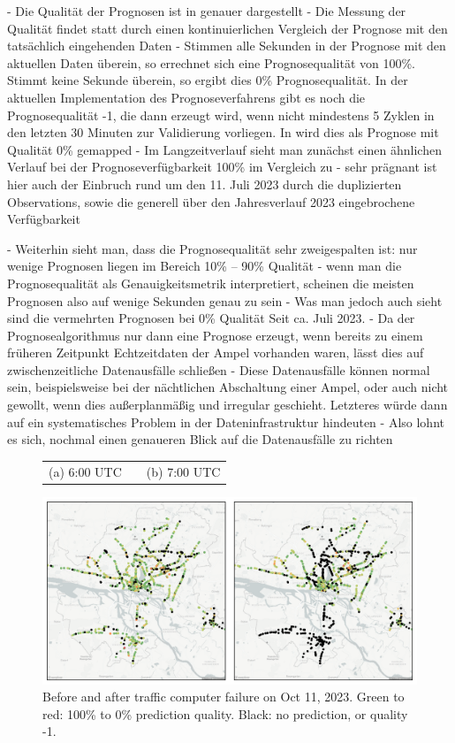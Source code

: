 - Die Qualität der Prognosen ist in  genauer dargestellt
- Die Messung der Qualität findet statt durch einen kontinuierlichen Vergleich der Prognose mit den tatsächlich eingehenden Daten
- Stimmen alle Sekunden in der Prognose mit den aktuellen Daten überein, so errechnet sich eine Prognosequalität von 100\%. Stimmt keine Sekunde überein, so ergibt dies 0\% Prognosequalität. In der aktuellen Implementation des Prognoseverfahrens gibt es noch die Prognosequalität -1, die dann erzeugt wird, wenn nicht mindestens 5 Zyklen in den letzten 30 Minuten zur Validierung vorliegen. In  wird dies als Prognose mit Qualität 0\% gemapped 
- Im Langzeitverlauf sieht man zunächst einen ähnlichen Verlauf bei der Prognoseverfügbarkeit 100\% im Vergleich zu  - sehr prägnant ist hier auch der Einbruch rund um den 11. Juli 2023 durch die duplizierten Observations, sowie die generell über den Jahresverlauf 2023 eingebrochene Verfügbarkeit

- Weiterhin sieht man, dass die Prognosequalität sehr zweigespalten ist: nur wenige Prognosen liegen im Bereich 10\% -- 90\% Qualität - wenn man die Prognosequalität als Genauigkeitsmetrik interpretiert, scheinen die meisten Prognosen also auf wenige Sekunden genau zu sein
- Was man jedoch auch sieht sind die vermehrten Prognosen bei 0\% Qualität Seit ca. Juli 2023. 
- Da der Prognosealgorithmus nur dann eine Prognose erzeugt, wenn bereits zu einem früheren Zeitpunkt Echtzeitdaten der Ampel vorhanden waren, lässt dies auf zwischenzeitliche Datenausfälle schließen
- Diese Datenausfälle können normal sein, beispielsweise bei der nächtlichen Abschaltung einer Ampel, oder auch nicht gewollt, wenn dies außerplanmäßig und irregular geschieht. Letzteres würde dann auf ein systematisches Problem in der Dateninfrastruktur hindeuten
- Also lohnt es sich, nochmal einen genaueren Blick auf die Datenausfälle zu richten

\begin{figure}[htbp]
    \centering
    \begin{tabular}{@{}cp{5cm}c@{}}
    (a) 6:00 UTC & & (b) 7:00 UTC\\
    \end{tabular}
    \includegraphics[width=\linewidth]{images/monitoring-before-after-failure.png}
    \caption{Before and after traffic computer failure on Oct 11, 2023. Green to red: 100\% to 0\% prediction quality. Black: no prediction, or quality -1.}\label{fig:monitoring-failure}
\end{figure}

